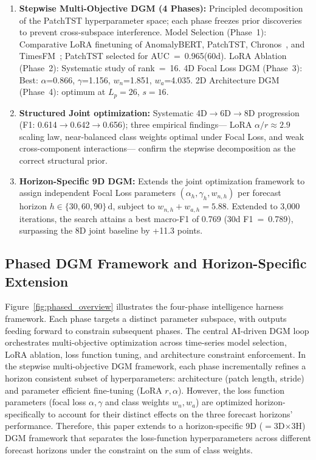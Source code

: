 ﻿\documentclass[twocolumn]{article}
\begin{document}
\begin{enumerate}[leftmargin=*,topsep=2pt,itemsep=1pt]
  \item \textbf{Stepwise Multi-Objective DGM (4 Phases):}
        Principled decomposition of the PatchTST hyperparameter
        space; each phase freezes prior discoveries to prevent
        cross-subspace interference.
        Model Selection (Phase~1): Comparative LoRA finetuning of AnomalyBERT, PatchTST,
        Chronos~\cite{ansari2024chronos}, and TimesFM~\cite{das2024timesfm};
        PatchTST selected for AUC~=~0.965(60d).
        LoRA Ablation (Phase~2): Systematic study of rank~=~16.
        4D Focal Loss DGM (Phase~3): Best: $\alpha$=0.866, $\gamma$=1.156,
        $w_n$=1.851, $w_a$=4.035.
        2D Architecture DGM (Phase~4): optimum at $L_p{=}26$, $s{=}16$.
  \item \textbf{Structured Joint optimization:}
        Systematic 4D$\to$6D$\to$8D progression (F1: 0.614$\to$0.642$\to$0.656);
        three empirical findings---
        LoRA $\alpha/r{\approx}2.9$ scaling law,
        near-balanced class weights optimal under Focal Loss,
        and weak cross-component interactions---
        confirm the stepwise decomposition as the correct structural prior.
  \item \textbf{Horizon-Specific 9D DGM:}
        Extends the joint optimization framework to assign
        independent Focal Loss parameters
        $(\alpha_h, \gamma_h, w_{n,h})$ per forecast horizon
        $h\in\{30,60,90\}\,\mathrm{d}$, subject to
        $w_{n,h}+w_{a,h}=5.88$.
        Extended to 3{,}000 iterations, the search
        attains a best macro-F1 of 0.769 (30d F1~=~0.789),
        surpassing the 8D joint baseline by +11.3 points.        
\end{enumerate}

\subsection{Phased DGM Framework and Horizon-Specific Extension}

Figure~\ref{fig:phased_overview} illustrates the four-phase
intelligence harness framework.
Each phase targets a distinct parameter subspace,
with outputs feeding forward to constrain subsequent phases.
The central AI-driven DGM loop orchestrates multi-objective
optimization across time-series model selection, LoRA ablation,
loss function tuning, and architecture constraint enforcement.
In the stepwise multi-objective DGM framework, each phase incrementally refines 
a horizon consistent subset of hyperparameters: architecture (patch length, stride) 
and parameter efficient fine-tuning (LoRA $r, \alpha$). 
However, the loss function parameters (focal loss $\alpha, \gamma$ and class weights $w_n, w_a$) 
are optimized horizon-specifically to account for their distinct effects on the three forecast horizons' performance.
Therefore, this paper extends to a horizon-specific 9D ($=$3D$\times$3H) DGM framework that separates the 
loss-function hyperparameters across different forecast horizons under the constraint on the sum of class weights.
\end{document}
